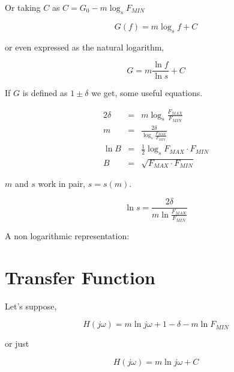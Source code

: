 \documentclass[a4paper,10pt]{article}
\begin{document}
Or taking $C$ as $C= G_0 - m \log_s{F_{MIN}} $ 

$$ G(f) = m \log_s{f} + C $$

or even expressed as the natural logarithm,

$$G = m \frac{\ln{f}}{\ln{s}} + C $$

If $G$ is defined as $1 \pm \delta $ we get, some useful equations.

\begin{eqnarray} 
  2 \delta & = & m \log_s { \frac{F_{MAX}}{ F_{MIN} } } \\
  m & = & \frac{2 \delta }{ \log_s{ \frac{F_{MAX}}{F_{MIN}} }} \\
  \ln{B} & = & \frac{1}{2} \log_s{ F_{MAX} \cdot F_{MIN}} \\
      B  & = & \sqrt{F_{MAX} \cdot F_{MIN}}  
\end{eqnarray}

$m$ and $s$ work in pair, $ s = s(m) $.

$$ \ln{s} = \frac{2 \delta}{ m \ln{ \frac{F_{MAX}}{F_{MIN}}} }  $$


A non logarithmic representation:



\section{Transfer Function}

Let's suppose,

\begin{equation}
 H(j\omega) = m \ln{j\omega} + 1 - \delta - m \ln{F_{MIN}}
\end{equation}

or just

\begin{equation}
 H(j\omega) = m \ln{j\omega} + C
\end{equation}
\end{document}
